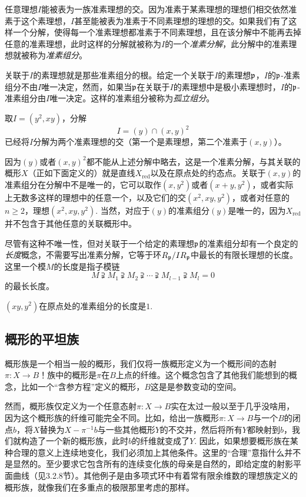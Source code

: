 任意理想$I$能被表为一族准素理想的交。因为准素于某素理想的理想们相交依然准素于这个素理想，$I$甚至能被表为准素于不同素理想的理想的交。如果我们有了这样一个分解，使得每一个准素理想都准素于不同素理想，且在该分解中不能再去掉任意的准素理想，此时这样的分解就被称为$I$的一个\textit{准素分解}，此分解中的准素理想就被称为\textit{准素组分}。

关联于$I$的素理想就是那些准素组分的根。给定一个关联于$I$的素理想$\mathfrak{p}$，$I$的$\mathfrak{p}$-准素组分不由$I$唯一决定，然而，如果当$\mathfrak{p}$在关联于$I$的素理想中是极小素理想时，$I$的$\mathfrak{p}$-准素组分由$I$唯一决定。这样的准素组分被称为\textit{孤立组分}。

\begin{exe}
	取$I=(y^2,xy)$，分解
	\[
	I=(y)\cap (x,y)^2
	\]
	已经将$I$分解为两个准素理想的交（第一个是素理想，第二个准素于$(x,y)$）。
\end{exe}

因为$(y)$或者$(x,y)^2$都不能从上述分解中略去，这是一个准素分解，与其关联的概形$X$（正如下面定义的）就是直线$X_{\mathrm{red}}$以及在原点处的约态点。关联于$(x,y)$的准素组分在分解中不是唯一的，它可以取作$(x,y^2)$或者$(x+y,y^2)$，或者实际上无数多这样的理想中的任意一个，以及它们的交$(x^2,xy,y^2)$，或者对任意的$n\geq 2$，理想$(x^2,xy,y^2)$. 当然，对应于$(y)$的准素组分$(y)$是唯一的，因为$X_{\mathrm{red}}$并不包含于其他任意的关联概形中。

尽管有这种不唯一性，但对关联于一个给定的素理想$\mathfrak{p}$的准素组分却有一个良定的\textit{长度}概念，不需要写出准素分解，它等于环$R_{\mathfrak{p}}/IR_{\mathfrak{p}}$中最长的有限长理想的长度。这里一个模$M$的长度是指子模链
\[
	M\supsetneqq M_1 \supsetneqq M_2 \supsetneqq \cdots \supsetneqq M_{l-1} \supsetneqq M_l=0
\]
的最长长度。

\begin{exe}
	$(xy,y^2)$在原点处的准素组分的长度是$1$.
\end{exe}

\subsection{概形的平坦族}\label{s.2.3.4}

概形族是一个相当一般的概形，我们仅将一族概形定义为一个概形间的态射$\pi:X\to B$！族中的概形是$\pi$在$B$上点的纤维。这个概念包含了其他我们能想到的概念，比如一个“含参方程”定义的概形，$B$这是是参数变动的空间。

然而，概形族仅定义为一个任意态射$\pi:X\to B$实在太过一般以至于几乎没啥用，因为这个概形族的纤维可能完全不同。比如，给出一族概形$\pi:X\to B$与一个$B$的闭点$b$，将$X$替换为$X-\pi^{-1}b$与一些其他概形$Y$的不交并，然后将所有$Y$都映射到$b$，我们就构造了一个新的概形族，此时$b$的纤维就变成了$Y$. 因此，如果想要概形族在某种合理的意义上连续地变化，我们必须加上其他条件。这里的“合理”意指什么并不是显然的。至少要求它包含所有的连续变化族的母亲是自然的，即给定度的射影平面曲线（见3.2.8节）。其他例子是由多项式环中有着常有限余维数的理想族定义的概形族，就像我们在多重点的极限那里考虑的那样。


